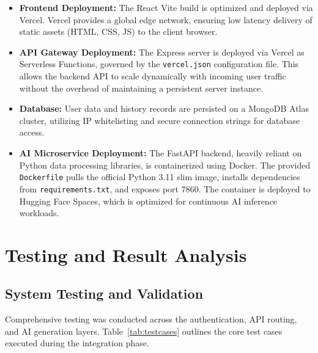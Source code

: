 \documentclass[12pt,a4paper]{report}
\begin{document}
\begin{itemize}
	\item \textbf{Frontend Deployment:} The React Vite build is optimized and deployed via Vercel. Vercel provides a global edge network, ensuring low latency delivery of static assets (HTML, CSS, JS) to the client browser.
	\item \textbf{API Gateway Deployment:} The Express server is deployed via Vercel as Serverless Functions, governed by the \texttt{vercel.json} configuration file. This allows the backend API to scale dynamically with incoming user traffic without the overhead of maintaining a persistent server instance.
	\item \textbf{Database:} User data and history records are persisted on a MongoDB Atlas cluster, utilizing IP whitelisting and secure connection strings for database access.
	\item \textbf{AI Microservice Deployment:} The FastAPI backend, heavily reliant on Python data processing libraries, is containerized using Docker. The provided \texttt{Dockerfile} pulls the official Python 3.11 slim image, installs dependencies from \texttt{requirements.txt}, and exposes port 7860. The container is deployed to Hugging Face Spaces, which is optimized for continuous AI inference workloads.
\end{itemize}

\chapter{Testing and Result Analysis}

\section{System Testing and Validation}
Comprehensive testing was conducted across the authentication, API routing, and AI generation layers. Table~\ref{tab:testcases} outlines the core test cases executed during the integration phase.
\end{document}
